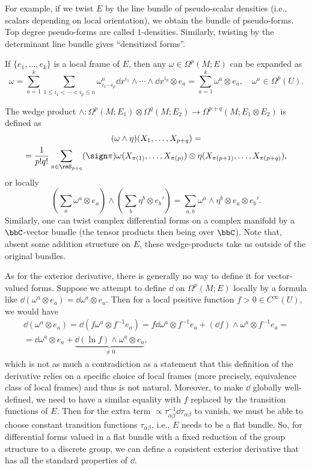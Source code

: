 For example, if we twist $E$ by the line bundle of pseudo-scalar densities (i.e., scalars depending on local orientation), we obtain the bundle of pseudo-forms. Top degree pseudo-forms are called $1$-densities. Similarly, twisting by the determinant line bundle gives ``densitized forms''.

If $\{e_1,\ldots,e_k\}$ is a local frame of $E$, then any $\omega\in\Omega^p(M;E)$ can be expanded as 
\[\omega=\sum_{a=1}^k\sum_{1\leq i_1<\cdots<i_p\leq n}\omega^a_{i_1\cdots i_p}\dd x^{i_1}\wedge\cdots\wedge \dd x^{i_p}\otimes e_a=\sum_{a=1}^k\omega^a\otimes e_a,\quad \omega^a\in\Omega^p(U).\]

The wedge product $\wedge:\Omega^p(M;E_1)\otimes \Omega^q(M;E_2)\to \Omega^{p+q}(M;E_1\otimes E_2)$ is defined as 
\begin{multline}
    (\omega\wedge\eta)(X_1,\ldots,X_{p+q})=\\=\frac{1}{p!q!}\sum_{\pi\in \rmS_{p+q}}(\sign\pi)\omega(X_{\pi(1)},\ldots,X_{\pi(p)})\otimes\eta(X_{\pi(p+1)},\ldots,X_{\pi(p+q)}),
\end{multline}
or locally 
\[\left(\sum_a\omega^a\otimes e_a\right)\wedge \left(\sum_b\eta^b\otimes e_b'\right)=\sum_{a,b}\omega^a\wedge\eta^b\otimes e_a\otimes e_b'.\]
Similarly, one can twist complex differential forms on a complex manifold by a  $\bbC$-vector bundle (the tensor products then being over $\bbC$). Note that, absent some addition structure on $E$, these wedge-products take us outside of the original bundles.

\begin{rem}
    As for the exterior derivative, there is generally no way to define it for vector-valued forms.
    Suppose we attempt to define $\dd$ on $\Omega^p(M;E)$ locally by a formula like $\dd(\omega^a\otimes e_a)=\dd \omega^a\otimes e_a$. Then for a local positive function $f>0\in C^\infty(U)$, we would have 
    \begin{multline}
        \dd(\omega^a\otimes e_a)=\dd(f\omega^a\otimes f^{-1}e_a)=f\dd\omega^a\otimes f^{-1}e_a+(\dd f)\wedge\omega^a\otimes f^{-1}e_a=\\=\dd\omega^a\otimes e_a+\underbrace{\dd(\ln f)\wedge\omega^a\otimes e_a}_{\neq 0},
    \end{multline}
    which is not as much a contradiction as a statement that this definition of the derivative relies on a specific choice of local frames (more precisely, equivalence class of local frames) and thus is not natural. Moreover, to make $\dd$ globally well-defined, we need to have a similar equality with $f$ replaced by the transition functions of $E$. Then for the extra term $\propto \tau_{\alpha\beta}^{-1}\dd\tau_{\alpha\beta}$ to vanish, we must be able to choose constant transition functions $\tau_{\alpha\beta}$, i.e., $E$ needs to be a flat bundle. So, for differential forms valued in a flat bundle with a fixed reduction of the group structure to a discrete group, we can define a consistent exterior derivative that has all the standard properties of $\dd$.
\end{rem}

